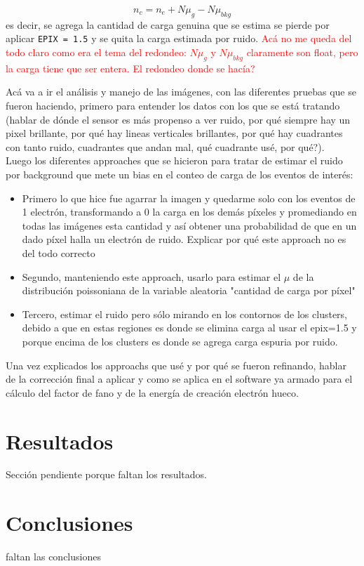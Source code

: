 \begin{equation*}
    n_{c} = n_{e} + N\mu_{g} - N\mu_{bkg}
\end{equation*}
es decir, se agrega la cantidad de carga genuina que se estima se pierde por aplicar \verb|EPIX = 1.5| y se quita la carga estimada por ruido. \textcolor{red}{Acá no me queda del todo claro como era el tema del redondeo: $N\mu_{g}$ y $N\mu_{bkg}$ claramente son float, pero la carga tiene que ser entera. El redondeo donde se hacía?}


\newpage
Acá va a ir el análisis y manejo de las imágenes, con las diferentes pruebas que se fueron haciendo, primero para entender los datos con los que se está tratando (hablar de dónde el sensor es más propenso a ver ruido, por qué siempre hay un pixel brillante, por qué hay lineas verticales brillantes, por qué hay cuadrantes con tanto ruido, cuadrantes que andan mal, qué cuadrante usé, por qué?).\\
\indent Luego los diferentes approaches que se hicieron para tratar de estimar el ruido por background que mete un bias en el conteo de carga de los eventos de interés:
\begin{itemize}
    \item Primero lo que hice fue agarrar la imagen y quedarme solo con los eventos de 1 electrón, transformando a 0 la carga en los demás píxeles y promediando en todas las imágenes esta cantidad y así obtener una probabilidad de que en un dado píxel halla un electrón de ruido. Explicar por qué este approach no es del todo correcto 
    \item Segundo, manteniendo este approach, usarlo para estimar el $\mu$ de la distribución poissoniana de la variable aleatoria "cantidad de carga por píxel"
    \item Tercero, estimar el ruido pero sólo mirando en los contornos de los clusters, debido a que en estas regiones es donde se elimina carga al usar el epix=1.5 y porque encima de los clusters es donde se agrega carga espuria por ruido.
\end{itemize}
Una vez explicados los approachs que usé y por qué se fueron refinando, hablar de la corrección final a aplicar y como se aplica en el software ya armado para el cálculo del factor de fano y de la energía de creación electrón hueco.


\chapter{Resultados}
Sección pendiente porque faltan los resultados.


\chapter{Conclusiones}
faltan las conclusiones